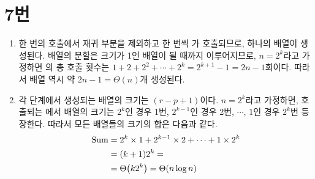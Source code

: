 \documentclass[10pt]{article}
\begin{document}
\section*{7번}
\begin{enumerate}[leftmargin=*, label=(\arabic*)]
    \item 한 번의  호출에서 재귀 부분을 제외하고 한 번씩 가 호출되므로, 하나의  배열이 생성된다.
    배열의 분할은 크기가 1인 배열이 될 때까지 이루어지므로, $n=2^k$라고 가정하면 의 총 호출 횟수는 $1 + 2 + 2^2 + \cdots + 2^k = 2^{k+1} - 1 = 2n - 1$회이다.
    따라서  배열 역시 약 $2n-1 = \Theta(n)$개 생성된다. 
    \item 각  단계에서 생성되는  배열의 크기는 $(r-p+1)$이다. 
    $n=2^k$라고 가정하면, 호출되는 에서 배열의 크기는 $2^k$인 경우 1번, $2^{k-1}$인 경우 2번, $\cdots$, $1$인 경우 $2^k$번 등장한다.
    따라서 모든  배열들의 크기의 합은 다음과 같다.
    \begin{align*}
        \text{Sum} &= 2^k \times 1 + 2^{k-1} \times 2 + \cdots + 1 \times 2^k \\
        &= (k+1)2^k = \\
        &= \Theta\qty(k2^k) = \Theta\qty(n\log{n})
    \end{align*}
\end{enumerate}
\end{document}
